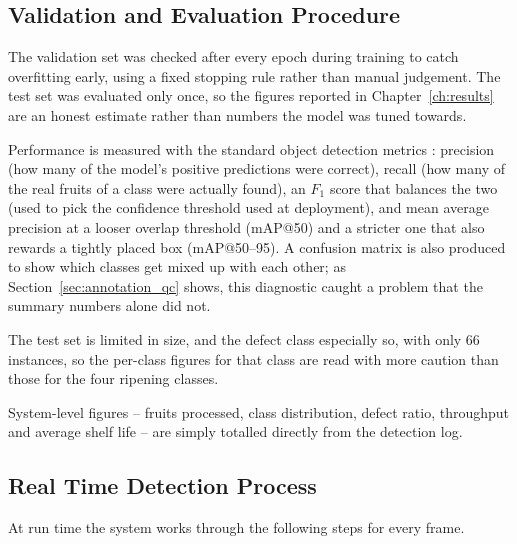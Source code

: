 \subsection{Validation and Evaluation Procedure}
\label{sec:m_evaluation}

The validation set was checked after every epoch during training to catch overfitting early, using a fixed stopping rule rather than manual judgement. The test set was evaluated only once, so the figures reported in Chapter~\ref{ch:results} are an honest estimate rather than numbers the model was tuned towards.

Performance is measured with the standard object detection metrics \citep{padilla2020}: precision (how many of the model's positive predictions were correct), recall (how many of the real fruits of a class were actually found), an $F_1$ score that balances the two (used to pick the confidence threshold used at deployment), and mean average precision at a looser overlap threshold (mAP@50) and a stricter one that also rewards a tightly placed box (mAP@50--95). A confusion matrix is also produced to show which classes get mixed up with each other; as Section~\ref{sec:annotation_qc} shows, this diagnostic caught a problem that the summary numbers alone did not.

The test set is limited in size, and the defect class especially so, with only 66 instances, so the per-class figures for that class are read with more caution than those for the four ripening classes.

System-level figures -- fruits processed, class distribution, defect ratio, throughput and average shelf life -- are simply totalled directly from the detection log.

\subsection{Real Time Detection Process}
\label{sec:m_realtime}

At run time the system works through the following steps for every frame.

